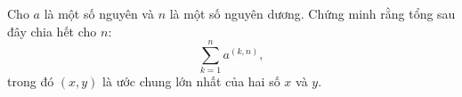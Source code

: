 \ifshowproblem
\begin{problem}\label{example:ROU-2015-TST-D2-P1}
\end{problem}
    Cho \( a \) là một số nguyên và \( n \) là một số nguyên dương.  
    Chứng minh rằng tổng sau đây chia hết cho \( n \):
    \[
        \sum_{k=1}^{n} a^{(k,n)},
    \]
    trong đó \( (x, y) \) là ước chung lớn nhất của hai số \( x \) và \( y \).
\fi

\footnotemark
{}
\fi
